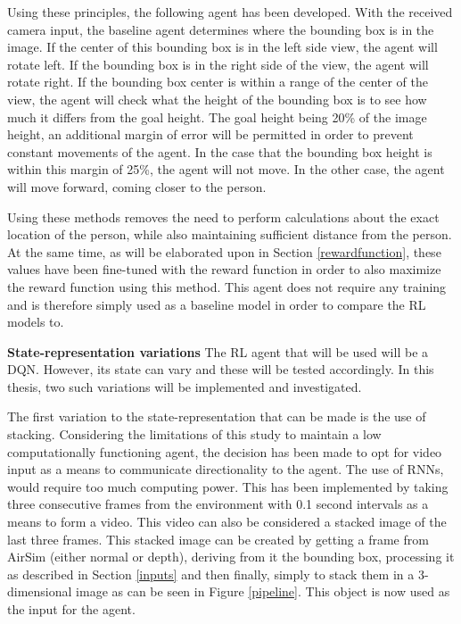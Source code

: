 Using these principles, the following agent has been developed. 
With the received camera input, the baseline agent determines where 
the bounding box is in the image. If the center of this bounding box is in the left side view, 
the agent will rotate left. If the bounding box is in the right side of the view, 
the agent will rotate right. If the bounding box center is within a range of the center 
of the view, the agent will check what the height of the bounding box is to see how much it 
differs from the goal height. The goal height being 20\% of the image height, an additional 
margin of error will be permitted in order to prevent constant movements of the agent. In the 
case that the bounding box height is within this margin of 25\%, 
the agent will not move. In the other case, the agent will move forward, coming closer to the 
person. 

Using these methods removes the 
need to perform calculations about the exact location of the person, while also maintaining 
sufficient distance from the person. At the same time, as will be elaborated upon in 
Section \ref{rewardfunction}, these values have been fine-tuned with the reward function in order 
to also maximize the reward function using this method. This agent does not require any training 
and is therefore simply used as a baseline model in order to compare the RL models to. \newline

\noindent
\textbf{State-representation variations} \label{stackedimages} \newline
The RL agent that will be used will be a DQN. However, its state can vary and these will 
be tested accordingly. In this thesis, two such variations will be implemented and investigated.

The first variation to the state-representation that can be made is the use of stacking.
Considering the limitations of this study to maintain a low computationally functioning agent, 
the decision has been made to opt for video input as a means to communicate directionality to the 
agent. The use of RNNs, would require too much computing power. This has been implemented 
by taking three consecutive frames from the environment with 0.1 second intervals
as a means to form a video. This video can also be considered a stacked image of the last three 
frames. This stacked image can be created by getting a frame from 
AirSim (either normal or depth), deriving from it the bounding box, 
processing it as described in Section \ref{inputs} and then finally, simply to stack 
them in a 3-dimensional image as can be seen in Figure \ref{pipeline}. This object is now used 
as the input for the agent.  

